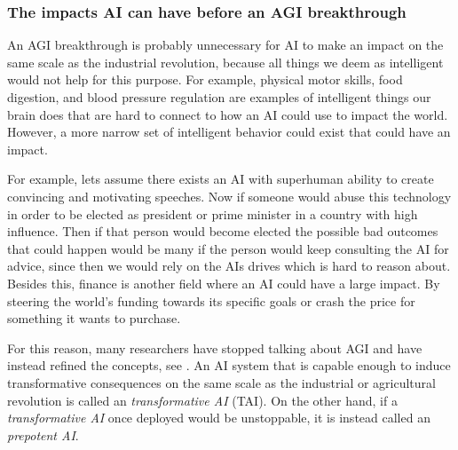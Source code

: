 \documentclass[12pt,A4]{report}
\theoremstyle{definition}
\begin{document}

\subsubsection{The impacts AI can have before an AGI breakthrough}
An AGI breakthrough is probably unnecessary for AI to make an impact on the same scale as the industrial revolution, because all things we deem as intelligent would not help for this purpose. For example, physical motor skills, food digestion, and blood pressure regulation are examples of intelligent things our brain does that are hard to connect to how an AI could use to impact the world. However, a more narrow set of intelligent behavior could exist that could have an impact. 

For example, lets assume there exists an AI with superhuman ability to create convincing and motivating speeches. Now if someone would abuse this technology in order to be elected as president or prime minister in a country with high influence. Then if that person would become elected the possible bad outcomes that could happen would be many if the person would keep consulting the AI for advice, since then we would rely on the AIs drives which is hard to reason about. Besides this, finance is another field where an AI could have a large impact. By steering the world's funding towards its specific goals or crash the price for something it wants to purchase. 

For this reason, many researchers have stopped talking about AGI and have instead refined the concepts, see \citet{CritchKruger}. An AI system that is capable enough to induce transformative consequences on the same scale as the industrial or agricultural revolution is called an \textit{transformative AI} (TAI). On the other hand, if a \textit{transformative AI} once deployed would be unstoppable, it is instead called an \textit{prepotent AI}. 
\end{document}
